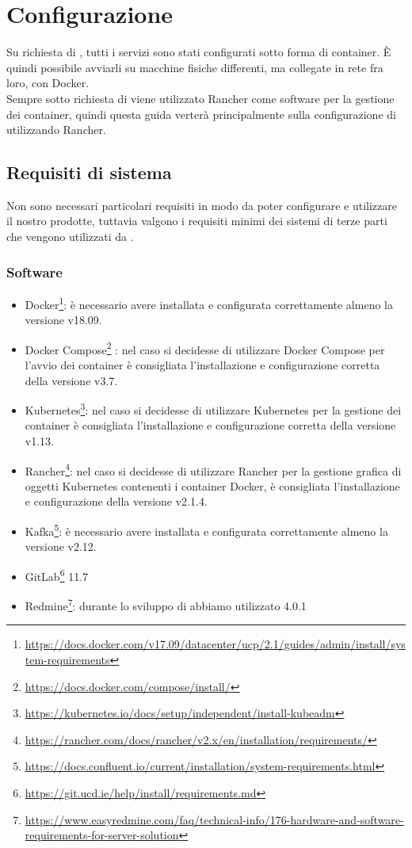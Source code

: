 \section{Configurazione}\label{configurazione}

Su richiesta di \II, tutti i servizi sono stati configurati sotto forma di container. È quindi possibile avviarli su macchine fisiche differenti, ma collegate in rete fra loro, con Docker.\\
Sempre sotto richiesta di \II viene utilizzato Rancher come software per la gestione dei container, quindi questa guida verterà principalmente sulla configurazione di \progetto utilizzando Rancher. %

\subsection{Requisiti di sistema}

	Non sono necessari particolari requisiti in modo da poter configurare e utilizzare il nostro prodotte, tuttavia valgono i requisiti minimi dei sistemi di terze parti che vengono utilizzati da \progetto.

	\subsubsection{Software}
		\begin{itemize}
			\item Docker\footnote{\url{https://docs.docker.com/v17.09/datacenter/ucp/2.1/guides/admin/install/system-requirements}}: è necessario avere installata e configurata correttamente almeno la versione v18.09.
			\item Docker Compose\footnote{\url{https://docs.docker.com/compose/install/}} :  nel caso si decidesse di utilizzare Docker Compose per l'avvio dei container è consigliata l'installazione e configurazione corretta della versione v3.7.
			\item Kubernetes\footnote{\url{https://kubernetes.io/docs/setup/independent/install-kubeadm}}: nel caso si decidesse di utilizzare Kubernetes per la gestione dei container è consigliata l'installazione e configurazione corretta della versione v1.13.
			\item Rancher\footnote{\url{https://rancher.com/docs/rancher/v2.x/en/installation/requirements/}}: nel caso si decidesse di utilizzare Rancher per la gestione grafica di oggetti Kubernetes contenenti i container Docker, è consigliata l'installazione e configurazione della versione v2.1.4.
			\item Kafka\footnote{\url{https://docs.confluent.io/current/installation/system-requirements.html}}: è necessario avere installata e configurata correttamente almeno la versione v2.12.
			\item GitLab\footnote{\url{https://git.ucd.ie/help/install/requirements.md}} 11.7
			\item Redmine\footnote{\url{https://www.easyredmine.com/faq/technical-info/176-hardware-and-software-requirements-for-server-solution}}: durante lo sviluppo di \progetto abbiamo utilizzato 4.0.1
		\end{itemize}
	
